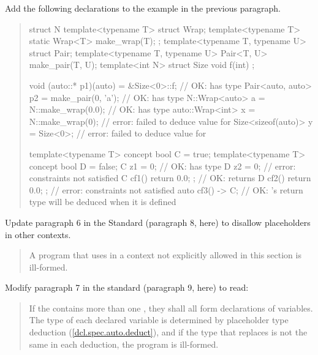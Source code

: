 Add the following declarations to the example in the previous paragraph.

\begin{quote}
\begin{addedblock}
\begin{codeblock}
struct N {
  template<typename T> struct Wrap;
  template<typename T> static Wrap<T> make_wrap(T);
};
template<typename T, typename U> struct Pair;
template<typename T, typename U> Pair<T, U> make_pair(T, U);
template<int N> struct Size { void f(int) { }  };

void (auto::* p1)(auto) = &Size<0>::f;   // OK:  has type 
Pair<auto, auto> p2 = make_pair(0, 'a'); // OK:  has type 
N::Wrap<auto> a = N::make_wrap(0.0);     // OK:  has type 
auto::Wrap<int> x = N::make_wrap(0);     // error: failed to deduce value for 
Size<sizeof(auto)> y = Size<0>{};        // error: failed to deduce value for 

template<typename T> concept bool C = true;
template<typename T> concept bool D = false;
C z1 = 0;                // OK:  has type 
D z2 = 0;                // error: constraints not satisfied
C cf1() { return 0.0; }; // OK:  returns 
D cf2() { return 0.0; }; // error: constraints not satisfied
auto cf3() -> C;         // OK: 's return type will be deduced when it is defined
\end{codeblock}
\end{addedblock}
\end{quote}

Update paragraph 6 in the \Cpp Standard (paragraph 8, here) to disallow 
placeholders in other contexts.

\begin{quote}
\pnum
A program that uses 
 in a context not explicitly allowed in this section is 
ill-formed.
\end{quote}


Modify paragraph 7 in the \Cpp standard (paragraph 9, here) to read:

\begin{quote}
\pnum
If the  contains more than one 
, they shall all form declarations of variables.
The type of each declared variable is determined by placeholder
type deduction (\ref{dcl.spec.auto.deduct}), and if 
the type that replaces  
is not the same in each deduction, the program is ill-formed.
\end{quote}

